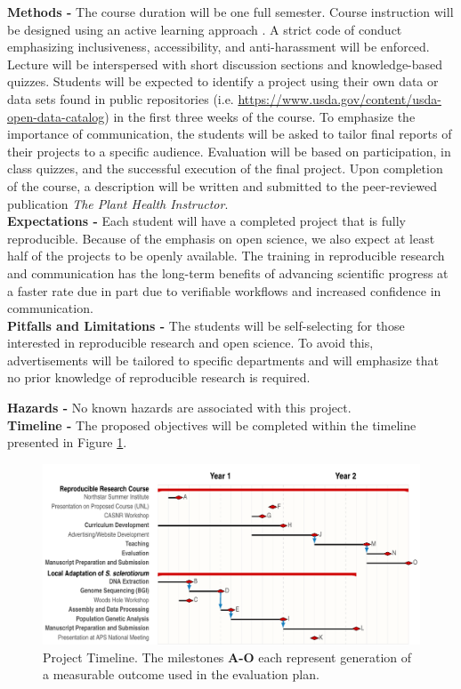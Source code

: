\documentclass[12pt,letterpaper]{article}
\begin{document}
\noindent \textbf{Methods -}
The course duration will be one full semester. 
Course instruction will be designed using an active learning approach \citep{freeman2014active}.
A strict code of conduct emphasizing inclusiveness, accessibility, and anti-harassment will be enforced.
Lecture will be interspersed with short discussion sections and knowledge-based quizzes.
Students will be expected to identify a project using their own data or data sets found in public repositories (i.e. \url{https://www.usda.gov/content/usda-open-data-catalog}) in the first three weeks of the course.
To emphasize the importance of communication, the students will be asked to tailor final reports of their projects to a specific audience.
Evaluation will be based on participation, in class quizzes, and the successful execution of the final project.
Upon completion of the course, a description will be written and submitted to the peer-reviewed publication \textit{The Plant Health Instructor}.\\
\noindent \textbf{Expectations -}
Each student will have a completed project that is fully reproducible. 
Because of the emphasis on open science, we also expect at least half of the projects to be openly available.
The training in reproducible research and communication has the long-term benefits of advancing scientific progress at a faster rate due in part due to verifiable workflows and increased confidence in communication.\\
\noindent \textbf{Pitfalls and Limitations -}
The students will be self-selecting for those interested in reproducible research and open science.
To avoid this, advertisements will be tailored to specific departments and will emphasize that no prior knowledge of reproducible research is required.

\noindent \textbf{Hazards -} No known hazards are associated with this project.\\
\noindent \textbf{Timeline -} The proposed objectives will be completed within the timeline presented in Figure \ref{fig:timeline}.

\begin{figure}[!htbp]
  \centering
  \includegraphics[width=\textwidth]{packet/timeline.pdf}
  \caption{Project Timeline. The milestones \textbf{A-O} each represent generation of a measurable outcome used in the evaluation plan.}
  \label{fig:timeline}
\end{figure}
\end{document}
